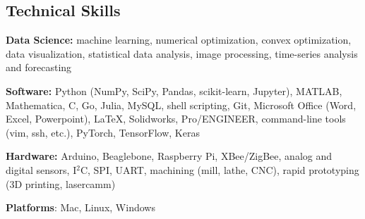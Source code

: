 \documentclass[10pt]{res}
\begin{document}
\begin{resume}
\section{Technical Skills}
\vspace{0.1in}

\textbf{Data Science:} machine learning, numerical optimization, convex
optimization, data visualization, statistical data analysis, image processing,
time-series analysis and forecasting

\textbf{Software:} Python (NumPy, SciPy, Pandas, scikit-learn, Jupyter),
MATLAB, Mathematica, C, Go, Julia, MySQL, shell scripting, Git, Microsoft Office
(Word, Excel, Powerpoint), LaTeX, Solidworks, Pro/ENGINEER, command-line tools
(vim, ssh, etc.), PyTorch, TensorFlow, Keras

\textbf{Hardware:} Arduino, Beaglebone, Raspberry Pi, XBee/ZigBee, analog and
digital sensors, I$^2$C, SPI, UART, machining (mill, lathe, CNC), rapid
prototyping (3D printing, lasercamm)

\textbf{Platforms}: Mac, Linux, Windows

\end{resume}
\end{document}
